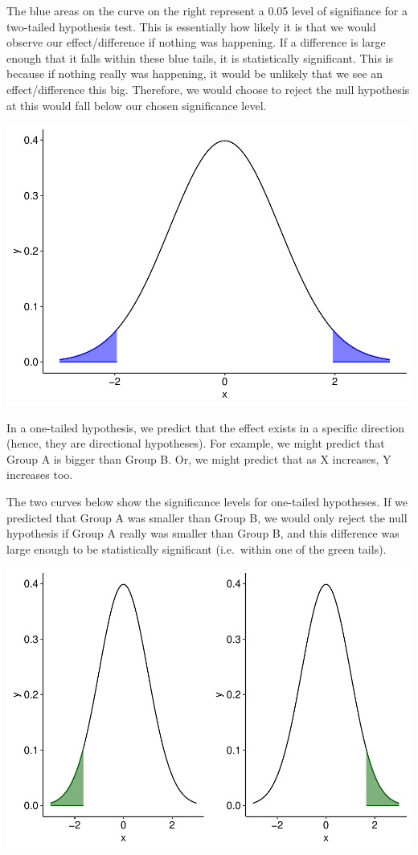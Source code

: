 \documentclass[
]{book}
\begin{document}
The blue areas on the curve on the right represent a 0.05 level of signifiance for a two-tailed hypothesis test. This is essentially how likely it is that we would observe our effect/difference if nothing was happening. If a difference is large enough that it falls within these blue tails, it is statistically significant. This is because if nothing really was happening, it would be unlikely that we see an effect/difference this big. Therefore, we would choose to reject the null hypothesis at this would fall below our chosen significance level.

\includegraphics{_main_files/figure-latex/unnamed-chunk-77-1.pdf}

In a one-tailed hypothesis, we predict that the effect exists in a specific direction (hence, they are directional hypotheses). For example, we might predict that Group A is bigger than Group B. Or, we might predict that as X increases, Y increases too.

The two curves below show the significance levels for one-tailed hypotheses. If we predicted that Group A was smaller than Group B, we would only reject the null hypothesis if Group A really was smaller than Group B, and this difference was large enough to be statistically significant (i.e.~within one of the green tails).

\includegraphics{_main_files/figure-latex/unnamed-chunk-78-1.pdf}
\end{document}
